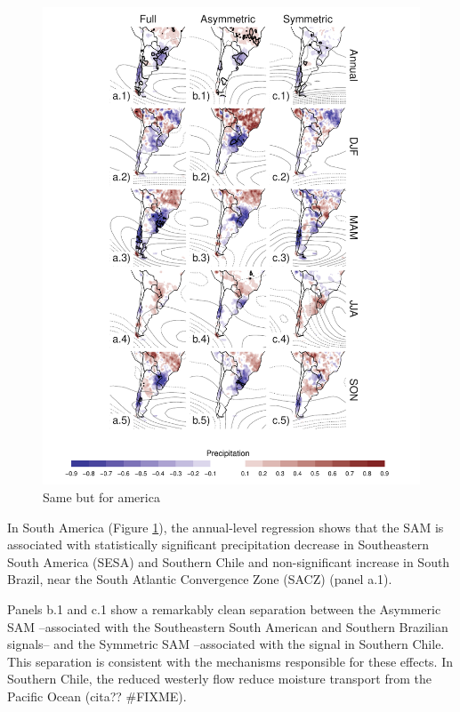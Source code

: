 \documentclass[]{ametsocV5}
\begin{document}
\begin{figure}
\includegraphics{pp-regr-america-1} \caption[Same but for america]{Same but for america}\label{fig:pp-regr-america}
\end{figure}

In South America (Figure \ref{fig:pp-regr-america}), the annual-level
regression shows that the SAM is associated with statistically
significant precipitation decrease in Southeastern South America (SESA)
and Southern Chile and non-significant increase in South Brazil, near
the South Atlantic Convergence Zone (SACZ) (panel a.1).

Panels b.1 and c.1 show a remarkably clean separation between the
Asymmeric SAM --associated with the Southeastern South American and
Southern Brazilian signals-- and the Symmetric SAM --associated with the
signal in Southern Chile. This separation is consistent with the
mechanisms responsible for these effects. In Southern Chile, the reduced
westerly flow reduce moisture transport from the Pacific Ocean (cita??
\#FIXME).
\end{document}
